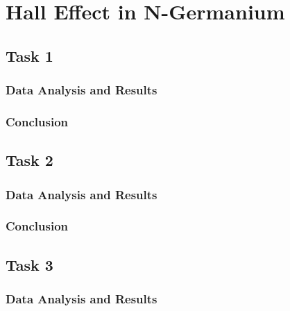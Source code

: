\documentclass[a4paper]{article}
\begin{document}


\section{Hall Effect in N-Germanium}

\subsection{Task 1}

\subsubsection{Data Analysis and Results}

\subsubsection{Conclusion}

\subsection{Task 2}

\subsubsection{Data Analysis and Results}

\subsubsection{Conclusion}

\subsection{Task 3}

\subsubsection{Data Analysis and Results}
\end{document}
